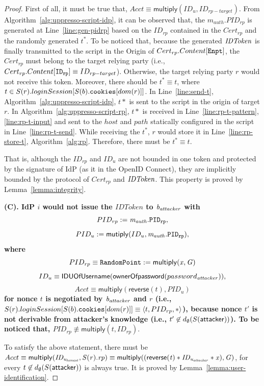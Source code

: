 \begin{proof}
    First of all, it must be true that, $Acct \equiv \mathsf{multiply}(ID_u, ID_{rp-target})$. From Algorithm~\ref{alg:uppresso-script-idp}, it can be observed that, the $m_{auth}.PID_{rp}$ is generated at Line~\ref{line:gen-pidrp} based on the $ID_{rp}$ contained in the $Cert_{rp}$ and the randomly generated $t^*$. To be noticed that, because the generated $\mathit{IDToken}$ is finally transmitted to the script in the Origin of $Cert_{rp}.Content[\mathtt{Enpt}]$, the $Cert_{rp}$ must belong to the target relying party (i.e., $Cert_{rp}.Content[\mathtt{ID_{rp}}] \equiv ID_{rp-target}$).  Otherwise, the target relying party $r$ would not receive this token. Moreover, there should be $t^* \equiv t$, where $t \in S(r).loginSession[S(b).\mathtt{cookies}[dom(r)]]$. In Line~\ref{line:send-t}, Algorithm~\ref{alg:uppresso-script-idp}, $t*$ is sent to the script in the origin of target $r$. In Algorithm~\ref{alg:uppresso-script-rp}, $t*$ is received in Line~\ref{line:rp-t-pattern}, \ref{line:rp-t-input} and sent to the $host$ and $path$ statically configured in the script in Line~\ref{line:rp-t-send}. While receiving the $t^*$, $r$ would store it in Line~\ref{line:rp-store-t}, Algorithm~\ref{alg:rp}. Therefore, there must be $t^* \equiv t$.
    
    That is, although the $ID_{rp}$ and $ID_u$ are not bounded in one token and protected by the signature of IdP (as it in the OpenID Connect), they are implicitly bounded by the protocol of  $Cert_{rp}$ and $\mathit{IDToken}$. This property is proved by Lemma~\ref{lemma:integrity}.
    
      
  
  
  \textbf{(C). IdP $i$ would not issue the $IDToken$ to $\mathit{b_{attacker}}$ with 
  $$PID_{rp} := \mathit{m_{auth}}.\mathtt{PID_{rp}} , $$
  $$PID_u := \mathsf{mutiply}(ID_u, \mathit{m_{auth}.\mathtt{PID_{rp}}}),$$
  where
  $$PID_{rp} \equiv \mathtt{RandomPoint} := \mathsf{multiply}(\mathit{x, G})$$
  $$ID_u \equiv \mathsf{IDUOfUsername} (\mathsf{ownerOfpassword}(password_{\mathit{attacker}})),$$
  $$Acct \equiv \mathsf{multiply}(\mathsf{reverse}(t), PID_u)$$
  for nonce $t$ is negotiated by $\mathit{b_{attacker}}$ and $r$ (i.e., $S(r).loginSession[S(b).\mathtt{cookies}[dom(r)]] \equiv \langle t, PID_{rp}, *\rangle$),
  because nonce $t'$ is not derivable from attacker's knowledge (i.e., $t' \not \in  d_{\emptyset}(S(\mathsf{attacker}))$).
  To be noticed that, $PID_{rp} \not\equiv \mathsf{multiply}(t, ID_{rp})$}.
  
  
  To satisfy the above statement, there must be $Acct \equiv \mathsf{multiply}(\mathit{ID_{u_{honest}}, S(r).rp}) \equiv \mathsf{multiply}(\mathit{(\mathsf{reverse}(\mathit{t})*ID_{u_{attacker}}*x), G})$,  for every $t \not \in d_{\emptyset}(S(\mathsf{attacker}))$ is always true. It is proved by Lemma~\ref{lemma:user-identification}.
  

\end{proof}
